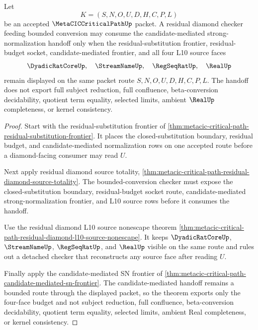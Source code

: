 \begin{theorem}
\label{thm:metacic-critical-path-residual-diamond-four-face-budget}
Let
$$
K=(S,N,O,U,D,H,C,P,L)
$$
be an accepted $\MetaCICCriticalPathUp$ packet. A residual diamond checker feeding bounded conversion may consume the candidate-mediated strong-normalization handoff only when the residual-substitution frontier, residual-budget socket, candidate-mediated frontier, and all four L10 source faces
$$
\DyadicRatCoreUp,\quad \StreamNameUp,\quad \RegSeqRatUp,\quad \RealUp
$$
remain displayed on the same packet route $S,N,O,U,D,H,C,P,L$. The handoff does not export full subject reduction, full confluence, beta-conversion decidability, quotient term equality, selected limits, ambient $\RealUp$ completeness, or kernel consistency.
\end{theorem}
\begin{proof}
Start with the residual-substitution frontier of \autoref{thm:metacic-critical-path-residual-substitution-frontier}. It places the closed-substitution boundary, residual budget, and candidate-mediated normalization rows on one accepted route before a diamond-facing consumer may read $U$.

Next apply residual diamond source totality, \autoref{thm:metacic-critical-path-residual-diamond-source-totality}. The bounded-conversion checker must expose the closed-substitution boundary, residual-budget socket route, candidate-mediated strong-normalization frontier, and L10 source rows before it consumes the handoff.

Use the residual diamond L10 source nonescape theorem \autoref{thm:metacic-critical-path-residual-diamond-l10-source-nonescape}. It keeps $\DyadicRatCoreUp$, $\StreamNameUp$, $\RegSeqRatUp$, and $\RealUp$ visible on the same route and rules out a detached checker that reconstructs any source face after reading $U$.

Finally apply the candidate-mediated SN frontier of \autoref{thm:metacic-critical-path-candidate-mediated-sn-frontier}. The candidate-mediated handoff remains a bounded route through the displayed packet, so the theorem exports only the four-face budget and not subject reduction, full confluence, beta-conversion decidability, quotient term equality, selected limits, ambient Real completeness, or kernel consistency.
\end{proof}

